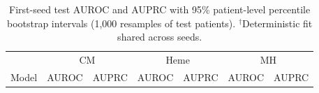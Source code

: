 \begin{table}[t]
\centering
\caption{First-seed test AUROC and AUPRC with 95\% patient-level percentile bootstrap intervals (1{,}000 resamples of test patients). $^{\dagger}$Deterministic fit shared across seeds.}
\label{tab:baseline-ci}
\small
\begin{tabular}{lcccccc}
\hline
 & \multicolumn{2}{c}{CM} & \multicolumn{2}{c}{Heme} & \multicolumn{2}{c}{MH} \\
Model & AUROC & AUPRC & AUROC & AUPRC & AUROC & AUPRC \\
\hline

\hline
\end{tabular}
\end{table}
